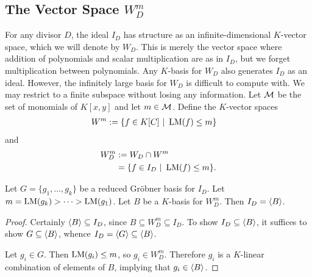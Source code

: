 
\subsection{The Vector Space $W_D^m$}

For any divisor $D$, the ideal $I_D$ has structure as an infinite-dimensional $K$-vector space,
which we will denote by $W_D$.
This is merely the vector space where addition of polynomials and scalar multiplication are as in $I_D$,
but we forget multiplication between polynomials.
Any $K$-basis for $W_D$ also generates $I_D$ as an ideal.
However, the infinitely large basis for $W_D$ is difficult to compute with.
We may restrict to a finite subspace without losing any information.
Let $\cal M$ be the set of monomials of $K[x,y]$ and let $m \in \cal M$.
Define the $K$-vector spaces
\begin{align*}
  W^m &:= \{ f \in K[C] ~|~ \LM(f) \leq m \}
\end{align*}
and
\begin{align*}
  W_D^m &:= W_D \cap W^m \\
        &= \{ f \in I_D ~|~ \LM(f) \leq m \}.
\end{align*}
\begin{comment}
\begin{remark}
  Since $-\nu_{P_\infty}(x^4) = -\nu_{P_\infty}(y^3)$, $W^{x^4} = W^{y^3}$.
  In practice, it is easier to assume $m$ is not divisible by $y^3$ and think of $W^m$ as the space
  \[ W^m = \{ f \in K[x,y] ~|~ \LM(f) \leq m, ~\text{$f$ is reduced modulo $y^3$} \}. \]
\end{remark}
\end{comment}
\begin{proposition}
  \label{prop_vector_space_basis_generates_I}
  Let $G = \{g_1, \ldots, g_k\}$ be a reduced Gr\"obner basis for $I_D$.
  Let $m = \LM(g_k) > \dots > \LM(g_1)$.
  Let $B$ be a $K$-basis for $W_D^m$.
  Then $I_D = \pid B$.
\end{proposition}
\begin{proof}
  Certainly $\pid B \subseteq I_D$, since $B \subseteq W_D^m \subseteq I_D$.
  To show $I_D \subseteq \pid B$, it suffices to show $G \subseteq \pid B$, whence $I_D = \pid G \subseteq \pid B$.
  
  Let $g_i \in G$.
  Then $\LM(g_i) \leq m$, so $g_i \in W_D^m$.
  Therefore $g_i$ is a $K$-linear combination of elements of $B$,
  implying that $g_i \in \pid B$.
\end{proof}

